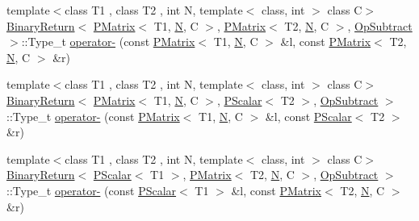 \begin{DoxyCompactItemize}
\item 
{\footnotesize template$<$class T1 , class T2 , int N, template$<$ class, int $>$ class C$>$ }\\\mbox{\hyperlink{structENSEM_1_1BinaryReturn}{Binary\+Return}}$<$ \mbox{\hyperlink{classENSEM_1_1PMatrix}{P\+Matrix}}$<$ T1, \mbox{\hyperlink{operator__name__util_8cc_a7722c8ecbb62d99aee7ce68b1752f337}{N}}, C $>$, \mbox{\hyperlink{classENSEM_1_1PMatrix}{P\+Matrix}}$<$ T2, \mbox{\hyperlink{operator__name__util_8cc_a7722c8ecbb62d99aee7ce68b1752f337}{N}}, C $>$, \mbox{\hyperlink{structENSEM_1_1OpSubtract}{Op\+Subtract}} $>$\+::Type\+\_\+t \mbox{\hyperlink{group__primmatrix_ga2f9d8cfed40f93d8bfffe86a9255ed52}{operator-\/}} (const \mbox{\hyperlink{classENSEM_1_1PMatrix}{P\+Matrix}}$<$ T1, \mbox{\hyperlink{operator__name__util_8cc_a7722c8ecbb62d99aee7ce68b1752f337}{N}}, C $>$ \&l, const \mbox{\hyperlink{classENSEM_1_1PMatrix}{P\+Matrix}}$<$ T2, \mbox{\hyperlink{operator__name__util_8cc_a7722c8ecbb62d99aee7ce68b1752f337}{N}}, C $>$ \&r)
\item 
{\footnotesize template$<$class T1 , class T2 , int N, template$<$ class, int $>$ class C$>$ }\\\mbox{\hyperlink{structENSEM_1_1BinaryReturn}{Binary\+Return}}$<$ \mbox{\hyperlink{classENSEM_1_1PMatrix}{P\+Matrix}}$<$ T1, \mbox{\hyperlink{operator__name__util_8cc_a7722c8ecbb62d99aee7ce68b1752f337}{N}}, C $>$, \mbox{\hyperlink{classENSEM_1_1PScalar}{P\+Scalar}}$<$ T2 $>$, \mbox{\hyperlink{structENSEM_1_1OpSubtract}{Op\+Subtract}} $>$\+::Type\+\_\+t \mbox{\hyperlink{group__primmatrix_gaa44a21f7776bb8fe8502a30e74d88e3f}{operator-\/}} (const \mbox{\hyperlink{classENSEM_1_1PMatrix}{P\+Matrix}}$<$ T1, \mbox{\hyperlink{operator__name__util_8cc_a7722c8ecbb62d99aee7ce68b1752f337}{N}}, C $>$ \&l, const \mbox{\hyperlink{classENSEM_1_1PScalar}{P\+Scalar}}$<$ T2 $>$ \&r)
\item 
{\footnotesize template$<$class T1 , class T2 , int N, template$<$ class, int $>$ class C$>$ }\\\mbox{\hyperlink{structENSEM_1_1BinaryReturn}{Binary\+Return}}$<$ \mbox{\hyperlink{classENSEM_1_1PScalar}{P\+Scalar}}$<$ T1 $>$, \mbox{\hyperlink{classENSEM_1_1PMatrix}{P\+Matrix}}$<$ T2, \mbox{\hyperlink{operator__name__util_8cc_a7722c8ecbb62d99aee7ce68b1752f337}{N}}, C $>$, \mbox{\hyperlink{structENSEM_1_1OpSubtract}{Op\+Subtract}} $>$\+::Type\+\_\+t \mbox{\hyperlink{group__primmatrix_ga6f60741d61098ca196a5f733f86a5835}{operator-\/}} (const \mbox{\hyperlink{classENSEM_1_1PScalar}{P\+Scalar}}$<$ T1 $>$ \&l, const \mbox{\hyperlink{classENSEM_1_1PMatrix}{P\+Matrix}}$<$ T2, \mbox{\hyperlink{operator__name__util_8cc_a7722c8ecbb62d99aee7ce68b1752f337}{N}}, C $>$ \&r)

\end{DoxyCompactItemize}
